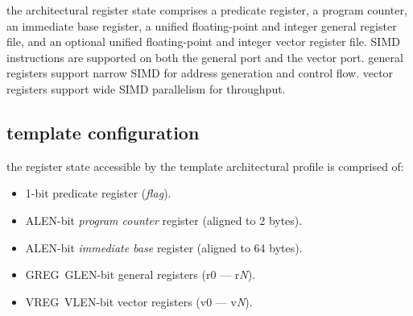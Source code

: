 
\newcommand{\registerspecrow}[4]{%
  \pgfmathsetmacro{\scl}{#2/#1}%
  \edef\xinit{#2}%
  \edef\yinit{#3}%
  \draw [black] (0,\yinit+0)    rectangle (\xinit,\yinit+1);
  \foreach \bl/\rlt/\mlt/\llt/\lm
    [remember=\xl as \xr (initially \xinit)]
    in {#4} {
    \pgfmathtruncatemacro{\isneg}{\bl<0 ? 1 : 0}%
    \pgfmathtruncatemacro{\bl}{abs(\bl)}%
    \pgfmathsetmacro{\xl}{\xr - \bl*\scl}%
    \pgfmathsetmacro{\xm}{(\xr+\xl)/2}%
    \ifnum\isneg=1
      \foreach \b in {0,...,\numexpr\bl-1\relax} {
        \pgfmathsetmacro{\bxl}{\xr - (\b+1)*\scl}%
        \pgfmathsetmacro{\bxr}{\xr - \b*\scl}%
        \draw[black!25,dashed] (\bxl,\yinit+0) rectangle (\bxr,\yinit+1);
      }
    \fi
    \draw[black] (\xl,\yinit+0) rectangle (\xr,\yinit+1);
    \ifx\rlt\empty\else
      \node[font=\tiny,anchor=base east] at (\xr,\yinit+1.25) {\textsf{\rlt}};
    \fi
    \ifx\mlt\empty\else
      \node[font=\tiny,anchor=base]      at (\xm,\yinit+1.25) {\textsf{\mlt}};
    \fi
    \ifx\llt\empty\else
      \node[font=\tiny,anchor=base west] at (\xl,\yinit+1.25) {\textsf{\llt}};
    \fi
    \ifx\lm\empty\else
      \node[font=\small,anchor=base]     at (\xm,\yinit+0.25) {\lm};
    \fi
  }
}
\newcommand{\registerspec}[3]{%
  \par\noindent%
  \begin{tikzpicture}[scale=0.45]
  \registerspecrow{#1}{#2}{0.0}{#3}
  \end{tikzpicture}%
}

the architectural register state comprises a predicate register, a program
counter, an immediate base register, a unified floating-point and integer
general register file, and an optional unified floating-point and integer
vector register file.
SIMD instructions are supported on both the general port and the vector port.
general registers support narrow SIMD for address generation and control flow.
vector registers support wide SIMD parallelism for throughput.

\subsection{template configuration}

the register state accessible by the template architectural
profile is comprised of:

\begin{itemize}[itemsep=0pt]
\item 1-bit predicate register (\emph{flag}).
\item ALEN-bit \emph{program counter} register (aligned to 2 bytes).
\item ALEN-bit \emph{immediate base} register (aligned to 64 bytes).
\item GREG \texttimes\,GLEN-bit general registers (\textsf{r0} --- \textsf{r\textit{N}}).
\item VREG \texttimes\,VLEN-bit vector registers (\textsf{v0} --- \textsf{v\textit{N}}).
\end{itemize}

